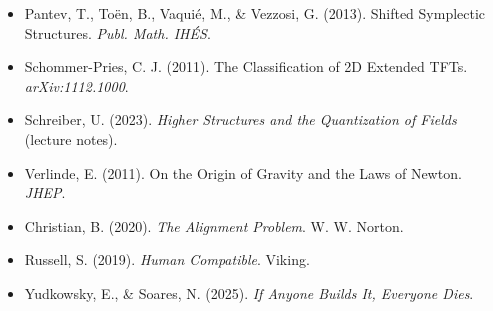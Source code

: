 \documentclass[12pt]{article}
\begin{document}
\begin{itemize}[leftmargin=1.2em]
  \item Pantev, T., Toën, B., Vaquié, M., \& Vezzosi, G. (2013). Shifted Symplectic Structures. \emph{Publ. Math. IHÉS}.
  \item Schommer-Pries, C. J. (2011). The Classification of 2D Extended TFTs. \emph{arXiv:1112.1000}.
  \item Schreiber, U. (2023). \emph{Higher Structures and the Quantization of Fields} (lecture notes).
  \item Verlinde, E. (2011). On the Origin of Gravity and the Laws of Newton. \emph{JHEP}.
  \item Christian, B. (2020). \emph{The Alignment Problem}. W. W. Norton.
  \item Russell, S. (2019). \emph{Human Compatible}. Viking.
  \item Yudkowsky, E., \& Soares, N. (2025). \emph{If Anyone Builds It, Everyone Dies}.
\end{itemize}
\end{document}
